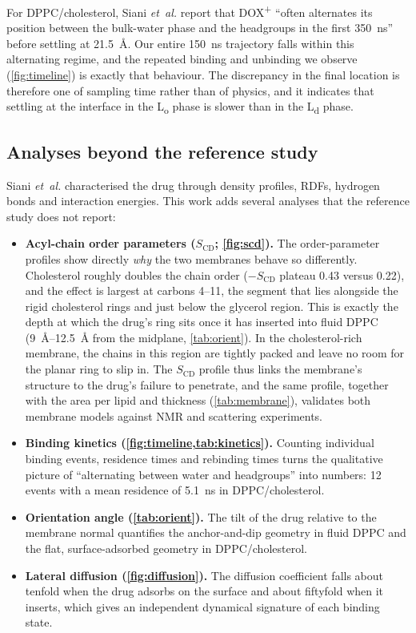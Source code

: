 \documentclass[11pt,a4paper]{article}
\newcommand{\dox}{DOX\textsuperscript{+}}
\newcommand{\scd}{S_{\mathrm{CD}}}
\newcommand{\Ld}{L\textsubscript{d}}
\newcommand{\Lo}{L\textsubscript{o}}
\begin{document}
For DPPC/cholesterol, Siani \emph{et~al.} report that \dox{} ``often alternates its position between the
bulk-water phase and the headgroups in the first \SI{350}{ns}'' before settling at
\SI{21.5}{\angstrom}. Our entire \SI{150}{ns} trajectory falls within this alternating regime, and the
repeated binding and unbinding we observe (\cref{fig:timeline}) is exactly that behaviour. The
discrepancy in the final location is therefore one of sampling time rather than of physics, and it
indicates that settling at the interface in the \Lo{} phase is slower than in the \Ld{} phase.

\subsection{Analyses beyond the reference study}
\label{sec:beyond}
Siani \emph{et~al.} characterised the drug through density profiles, RDFs, hydrogen bonds and interaction
energies. This work adds several analyses that the reference study does not report:
\begin{itemize}
  \item \textbf{Acyl-chain order parameters ($\scd$; \cref{fig:scd}).} The order-parameter profiles show
        directly \emph{why} the two membranes behave so differently. Cholesterol roughly doubles the chain
        order ($-\scd$ plateau 0.43 versus 0.22), and the effect is largest at carbons 4--11, the segment
        that lies alongside the rigid cholesterol rings and just below the glycerol region. This is
        exactly the depth at which the drug's ring sits once it has inserted into fluid DPPC
        (\SIrange{9}{12.5}{\angstrom} from the midplane, \cref{tab:orient}). In the cholesterol-rich
        membrane, the chains in this region are tightly packed and leave no room for the planar ring
        to slip in. The $\scd$ profile thus links the membrane's structure to the drug's failure to
        penetrate, and the same profile, together with the area per lipid and thickness
        (\cref{tab:membrane}), validates both membrane models against NMR and scattering experiments.
  \item \textbf{Binding kinetics (\cref{fig:timeline,tab:kinetics}).} Counting individual binding events,
        residence times and rebinding times turns the qualitative picture of ``alternating between water
        and headgroups'' into numbers: 12 events with a mean residence of \SI{5.1}{ns} in DPPC/cholesterol.
  \item \textbf{Orientation angle (\cref{tab:orient}).} The tilt of the drug relative to the membrane
        normal quantifies the anchor-and-dip geometry in fluid DPPC and the flat, surface-adsorbed
        geometry in DPPC/cholesterol.
  \item \textbf{Lateral diffusion (\cref{fig:diffusion}).} The diffusion coefficient falls about tenfold
        when the drug adsorbs on the surface and about fiftyfold when it inserts, which gives an
        independent dynamical signature of each binding state.
\end{itemize}
\end{document}

